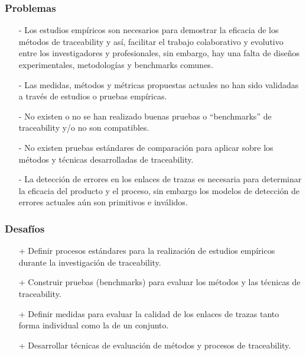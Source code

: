 \documentclass[a4paper,12pt,oneside,spanish]{book}
\begin{document}
\subsubsection{Problemas}

\begin{itemize}

\item[-] Los estudios empíricos son necesarios para demostrar la eficacia de los métodos de traceability y así, facilitar el trabajo colaborativo y evolutivo entre los investigadores y profesionales, sin embargo, hay una falta de diseños experimentales, metodologías y benchmarks comunes.

\item[-] Las medidas, métodos y métricas propuestas actuales no han sido validadas a través de estudios o pruebas empíricas.

\item[-] No existen o no se han realizado buenas pruebas o “benchmarks” de traceability y/o no son compatibles.

\item[-] No existen pruebas estándares de comparación para aplicar sobre los métodos y técnicas desarrolladas de traceability.

\item[-] La detección de errores en los enlaces de trazas es necesaria para determinar la eficacia del producto y el proceso, sin embargo los modelos de detección de errores actuales aún son primitivos e inválidos.

\end{itemize}

\subsubsection{Desafíos}

\begin{itemize}

\item[+] Definir procesos estándares para la realización de estudios empíricos durante la investigación de traceability.

\item[+] Construir pruebas (benchmarks) para evaluar los métodos y las técnicas de traceability.

\item[+] Definir medidas para evaluar la calidad de los enlaces de trazas tanto forma individual como la de un conjunto.

\item[+] Desarrollar técnicas de evaluación de métodos y procesos de traceability.

\end{itemize}
\end{document}

